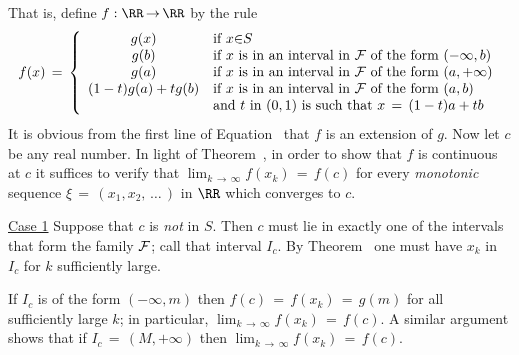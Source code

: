     That is, define $f:{\RR} \,{\rightarrow}\, {\RR}$ by the rule
        \begin{equation}
        \label{EqnF.20}
        f(x) \,=\, \left\{
        \begin{array}{cl}
              g(x)      & \mbox{if $x{\in}S$} \\
              g(b)      & \mbox{if $x$ is in an interval in ${\cal F}$ of the form $(-{\infty},b)$} \\
              g(a)      & \mbox{if $x$ is in an interval in ${\cal F}$ of the form $(a,+{\infty})$} \\
        (1-t)g(a)+tg(b) & \mbox{if $x$ is in an interval in ${\cal F}$ of the form $(a,b)$} \\
                          &  \mbox{and $t$ in $(0,1)$ is such that $x \,=\, (1-t)a+tb$}
        \end{array}
        \right.
        \end{equation}
    It is obvious from the first line of Equation~ that $f$ is an extension of $g$.
    Now let $c$ be any real number. In light of Theorem~, in order to show that $f$ is continuous at $c$ it suffices to verify that $\lim_{k \,{\rightarrow}\, {\infty}} f(x_{k}) \,=\, f(c)$ for every {\em monotonic} sequence ${\xi} \,=\, (x_{1},x_{2},\,{\ldots}\,)$ in ${\RR}$ which converges to $c$.


        \underline{Case 1} Suppose that $c$ is {\em not} in $S$.
    Then $c$ must lie in exactly one of the intervals that form the family ${\cal F}$; call that interval $I_{c}$.
    By Theorem~ one must have $x_{k}$ in $I_{c}$ for $k$ sufficiently large.

        If $I_{c}$ is of the form $(-{\infty},m)$ then $f(c) \,=\, f(x_{k}) \,=\, g(m)$ for all sufficiently large $k$;
in particular, $\lim_{k \,{\rightarrow}\, {\infty}} f(x_{k}) \,=\, f(c)$.
    A similar argument shows that if $I_{c} \,=\, (M,+{\infty})$ then $\lim_{k \,{\rightarrow}\, {\infty}} f(x_{k}) \,=\, f(c)$.

